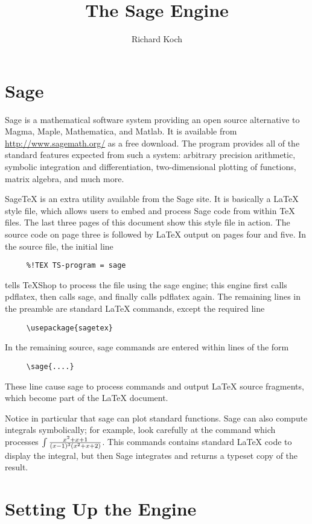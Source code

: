 \documentclass[11pt, oneside]{amsart}
\title{The Sage Engine}
\author{Richard Koch}
\begin{document}
\maketitle
\section{Sage}

Sage is a mathematical software system providing an open source alternative to Magma, Maple, Mathematica, and Matlab. It is available from 
\url{http://www.sagemath.org/} as a free download. The program provides all of the standard features expected from such a system: arbitrary precision arithmetic, symbolic integration and differentiation, two-dimensional plotting of functions, matrix algebra, and much more.

SageTeX is an extra utility available from the Sage site. It is basically a LaTeX style file, which  allows users to embed and process Sage code from within TeX files. The last three pages of this document show this style file in action. The source code on page three is followed by LaTeX output on pages four and five. In the source file, the initial line
\begin{verbatim}
     %!TEX TS-program = sage
\end{verbatim}
tells TeXShop to process the file using the sage engine; this engine first calls pdflatex, then calls sage, and finally calls pdflatex again.
The remaining lines in the preamble are standard LaTeX commands, except the required line
\begin{verbatim}
     \usepackage{sagetex}
\end{verbatim}
In the remaining source, sage commands are entered within lines of the form
\begin{verbatim}
     \sage{....}
\end{verbatim}
These line cause sage to process commands and output LaTeX source fragments, which become part of the LaTeX document.

Notice in particular that sage can plot standard functions. Sage can also compute integrals symbolically; for example, look carefully at the command which processes $\int {{x^2 + x + 1} \over {(x - 1)^3 (x^2 + x + 2)}}$. This commands contains standard LaTeX code to display the integral, but then Sage integrates and returns a typeset copy of the result.

\section{Setting Up the Engine}
\end{document}
